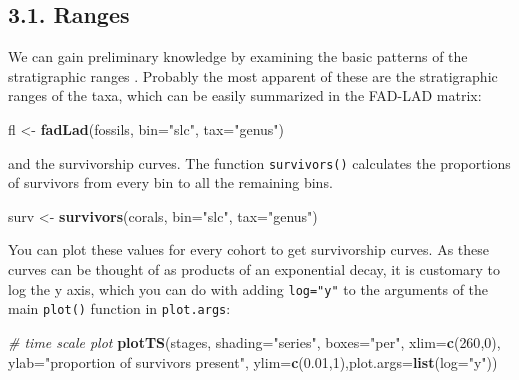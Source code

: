 \documentclass[]{article}
\newenvironment{Shaded}{\begin{snugshade}}{\end{snugshade}}
\newcommand{\CommentTok}[1]{\textcolor[rgb]{0.56,0.35,0.01}{\textit{#1}}}
\newcommand{\DataTypeTok}[1]{\textcolor[rgb]{0.13,0.29,0.53}{#1}}
\newcommand{\DecValTok}[1]{\textcolor[rgb]{0.00,0.00,0.81}{#1}}
\newcommand{\FloatTok}[1]{\textcolor[rgb]{0.00,0.00,0.81}{#1}}
\newcommand{\KeywordTok}[1]{\textcolor[rgb]{0.13,0.29,0.53}{\textbf{#1}}}
\newcommand{\NormalTok}[1]{#1}
\newcommand{\StringTok}[1]{\textcolor[rgb]{0.31,0.60,0.02}{#1}}
\begin{document}
\hypertarget{ranges}{%
\subsection{3.1. Ranges}\label{ranges}}

We can gain preliminary knowledge by examining the basic patterns of the
stratigraphic ranges . Probably the most apparent of these are the
stratigraphic ranges of the taxa, which can be easily summarized in the
FAD-LAD matrix:

\begin{Shaded}
\begin{Highlighting}[]
\NormalTok{fl <-}\StringTok{ }\KeywordTok{fadLad}\NormalTok{(fossils, }\DataTypeTok{bin=}\StringTok{"slc"}\NormalTok{, }\DataTypeTok{tax=}\StringTok{"genus"}\NormalTok{)}
\end{Highlighting}
\end{Shaded}

and the survivorship curves. The function \texttt{survivors()}
calculates the proportions of survivors from every bin to all the
remaining bins.

\begin{Shaded}
\begin{Highlighting}[]
\NormalTok{surv <-}\StringTok{ }\KeywordTok{survivors}\NormalTok{(corals, }\DataTypeTok{bin=}\StringTok{"slc"}\NormalTok{, }\DataTypeTok{tax=}\StringTok{"genus"}\NormalTok{)}
\end{Highlighting}
\end{Shaded}

You can plot these values for every cohort to get survivorship curves.
As these curves can be thought of as products of an exponential decay,
it is customary to log the y axis, which you can do with adding
\texttt{log="y"} to the arguments of the main \texttt{plot()} function
in \texttt{plot.args}:

\begin{Shaded}
\begin{Highlighting}[]
\CommentTok{# time scale plot}
\KeywordTok{plotTS}\NormalTok{(stages, }\DataTypeTok{shading=}\StringTok{"series"}\NormalTok{, }\DataTypeTok{boxes=}\StringTok{"per"}\NormalTok{, }
  \DataTypeTok{xlim=}\KeywordTok{c}\NormalTok{(}\DecValTok{260}\NormalTok{,}\DecValTok{0}\NormalTok{), }\DataTypeTok{ylab=}\StringTok{"proportion of survivors present"}\NormalTok{,}
  \DataTypeTok{ylim=}\KeywordTok{c}\NormalTok{(}\FloatTok{0.01}\NormalTok{,}\DecValTok{1}\NormalTok{),}\DataTypeTok{plot.args=}\KeywordTok{list}\NormalTok{(}\DataTypeTok{log=}\StringTok{"y"}\NormalTok{))}
\end{Highlighting}
\end{Shaded}
\end{document}
